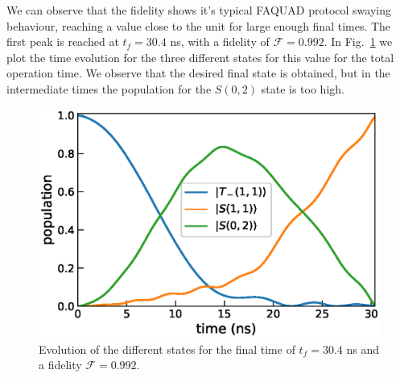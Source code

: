 \documentclass[a4paper,11pt]{article}
\begin{document}
We can observe that the fidelity shows it's typical FAQUAD protocol swaying behaviour, reaching a value close to the unit for large enough final times. The first peak is reached at $t_f=30.4$ ns, with a fidelity of $\mathcal{F}=0.992$. In Fig.~\ref{fig:states_evolution} we plot the time evolution for the three different states for this value for the total operation time. We observe that the desired final state is obtained, but in the intermediate times the population for the $S(0,2)$ state is too high.
\begin{figure}[!htbp]
	\centering
	\includegraphics[width=0.7\linewidth]{states_evolution.eps}
	\caption{Evolution of the different states for the final time of $t_f=30.4$ ns and a fidelity $\mathcal{F}=0.992$.}
	\label{fig:states_evolution}
\end{figure}


\appendix
\end{document}
